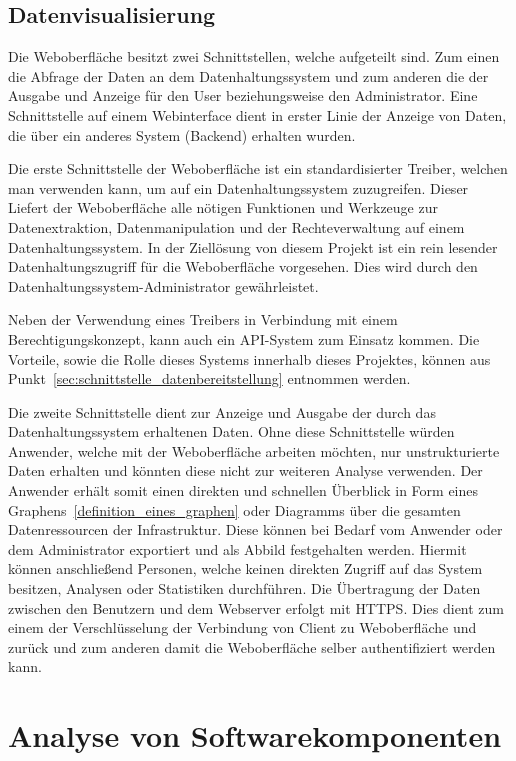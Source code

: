 \section{Datenvisualisierung}
Die Weboberfläche besitzt zwei Schnittstellen, welche aufgeteilt sind. Zum
einen die Abfrage der Daten an dem Datenhaltungssystem und zum anderen die der
Ausgabe und Anzeige für den User beziehungsweise den Administrator. Eine
Schnittstelle auf einem Webinterface dient in erster Linie der Anzeige von
Daten, die über ein anderes System (Backend) erhalten wurden.

Die erste Schnittstelle der Weboberfläche ist ein standardisierter Treiber,
welchen man verwenden kann, um auf ein Datenhaltungssystem zuzugreifen. Dieser
Liefert der Weboberfläche alle nötigen Funktionen und Werkzeuge zur
Datenextraktion, Datenmanipulation und der Rechteverwaltung auf einem
Datenhaltungssystem. In der Ziellösung von diesem Projekt ist ein rein
lesender Datenhaltungszugriff für die Weboberfläche vorgesehen. Dies wird durch
den Datenhaltungssystem-Administrator gewährleistet.

Neben der Verwendung eines Treibers in Verbindung mit einem
Berechtigungskonzept, kann auch ein API-System zum Einsatz kommen. Die
Vorteile, sowie die Rolle dieses Systems innerhalb dieses Projektes, können aus
Punkt~\ref{sec:schnittstelle_datenbereitstellung} entnommen werden.

Die zweite Schnittstelle dient zur Anzeige und Ausgabe der durch das
Datenhaltungssystem erhaltenen Daten. Ohne diese Schnittstelle würden Anwender,
welche mit der Weboberfläche arbeiten möchten, nur unstrukturierte Daten
erhalten und könnten diese nicht zur weiteren Analyse verwenden. Der Anwender
erhält somit einen direkten und schnellen Überblick in Form eines
Graphens~\ref{definition_eines_graphen} oder Diagramms über die gesamten
Datenressourcen der Infrastruktur. Diese können bei Bedarf vom Anwender oder
dem Administrator exportiert und als Abbild festgehalten werden. Hiermit können
anschließend Personen, welche keinen direkten Zugriff auf das System besitzen,
Analysen oder Statistiken durchführen. Die Übertragung der Daten zwischen den
Benutzern und dem Webserver erfolgt mit \gls{HTTPS}. Dies dient zum einem der
Verschlüsselung der Verbindung von Client zu Weboberfläche und zurück und zum
anderen damit die Weboberfläche selber authentifiziert werden kann.
\mr%

\chapter{Analyse von Softwarekomponenten}
